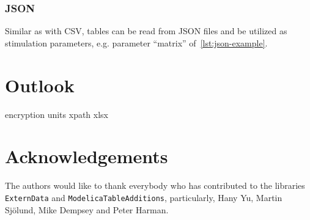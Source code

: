 \documentclass{modelica}
\newcommand{\modelica}[1]{\lstinline[language=modelica]|#1|}
\begin{document}
\subsubsection{JSON}

Similar as with CSV, tables can be read from JSON files and be utilized as stimulation parameters, e.g. parameter ``matrix'' of~\autoref{lst:json-example}.

\section{Outlook}
encryption
units
xpath
xlsx

\section*{Acknowledgements}

The authors would like to thank everybody who has contributed to the libraries \modelica{ExternData} and \modelica{ModelicaTableAdditions}, particularly, Hany Yu, Martin Sjölund, Mike Dempsey and Peter Harman.

\printbibliography
\end{document}
